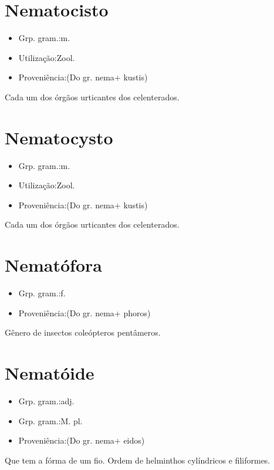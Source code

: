 \section{Nematocisto}
\begin{itemize}
\item {Grp. gram.:m.}
\end{itemize}
\begin{itemize}
\item {Utilização:Zool.}
\end{itemize}
\begin{itemize}
\item {Proveniência:(Do gr. \textunderscore nema\textunderscore  + \textunderscore kustis\textunderscore )}
\end{itemize}
Cada um dos órgãos urticantes dos celenterados.
\section{Nematocysto}
\begin{itemize}
\item {Grp. gram.:m.}
\end{itemize}
\begin{itemize}
\item {Utilização:Zool.}
\end{itemize}
\begin{itemize}
\item {Proveniência:(Do gr. \textunderscore nema\textunderscore  + \textunderscore kustis\textunderscore )}
\end{itemize}
Cada um dos órgãos urticantes dos celenterados.
\section{Nematófora}
\begin{itemize}
\item {Grp. gram.:f.}
\end{itemize}
\begin{itemize}
\item {Proveniência:(Do gr. \textunderscore nema\textunderscore  + \textunderscore phoros\textunderscore )}
\end{itemize}
Gênero de insectos coleópteros pentâmeros.
\section{Nematóide}
\begin{itemize}
\item {Grp. gram.:adj.}
\end{itemize}
\begin{itemize}
\item {Grp. gram.:M. pl.}
\end{itemize}
\begin{itemize}
\item {Proveniência:(Do gr. \textunderscore nema\textunderscore  + \textunderscore eidos\textunderscore )}
\end{itemize}
Que tem a fórma de um fio.
Ordem de helminthos cylíndricos e filiformes.
